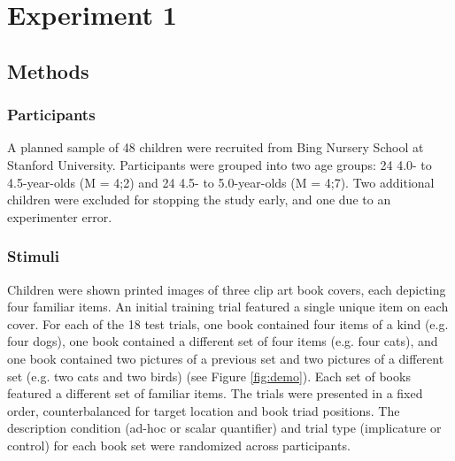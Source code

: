\documentclass[10pt,letterpaper]{article}
\begin{document}
	

\section{Experiment 1} 

\subsection{Methods}
\subsubsection{Participants}

A planned sample of 48 children were recruited from Bing Nursery School at Stanford University.  Participants were grouped into two age groups: 24 4.0- to 4.5-year-olds (M = 4;2) and 24 4.5- to 5.0-year-olds (M = 4;7). Two additional children were excluded for stopping the study early, and one due to an experimenter error. 
\subsubsection{Stimuli}

Children were shown printed images of three clip art book covers, each depicting four familiar items. An initial training trial featured a single unique item on each cover. For each of the 18 test trials, one book contained four items of a kind (e.g. four dogs), one book contained a different set of four items (e.g. four cats), and one book contained two pictures of a previous set and two pictures of a different set (e.g. two cats and two birds) (see Figure \ref{fig:demo}). Each set of books featured a different set of familiar items. The trials were presented in a fixed order, counterbalanced for target location and book triad positions.  The description condition (ad-hoc or scalar quantifier) and trial type (implicature or control) for each book set were randomized across participants. 
\end{document}
